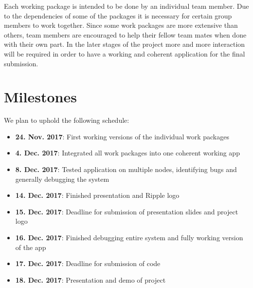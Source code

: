 \documentclass{report}
\begin{document}
Each working package is intended to be done by an individual team member. Due to the dependencies of some of the packages it is necessary for certain group members to work together. Since some work packages are more extensive than others, team members are encouraged to help their fellow team mates when done with their own part. In the later stages of the project more and more interaction will be required in order to have a working and coherent application for the final submission. 
 
\section{Milestones}

We plan to uphold the following schedule:
\begin{itemize}
\item  \textbf{24. Nov. 2017}: First working versions of the individual work packages
\item  \textbf{4. Dec. 2017}: Integrated all work packages into one coherent working app
\item \textbf{8. Dec. 2017}: Tested application on multiple nodes, identifying bugs and generally debugging the system
\item \textbf{14. Dec. 2017}: Finished presentation and Ripple logo
\item \textbf{15. Dec. 2017}: Deadline for submission of presentation slides and project logo
\item \textbf{16. Dec. 2017}: Finished debugging entire system and fully working version of the app
\item \textbf{17. Dec. 2017}: Deadline for submission of code
\item \textbf{18. Dec. 2017}: Presentation and demo of project
\end{itemize}



\end{document}
